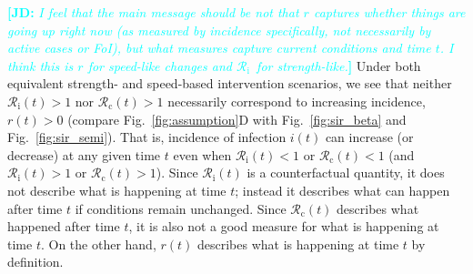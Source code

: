 \documentclass[12pt]{article}
\newcommand{\comment}{\showcomment}
\newcommand{\showcomment}[3]{\textcolor{#1}{\textbf{[#2: }\textsl{#3}\textbf{]}}}
\newcommand{\jd}[1]{\comment{cyan}{JD}{#1}}
\newcommand{\fref}[1]{Fig.~\ref{fig:#1}}
\newcommand{\Rx}[1]{\ensuremath{{\mathcal R}_{#1}}\xspace}
\newcommand{\Rc}{\Rx{\mathrm{c}}}
\newcommand{\Ri}{\Rx{\mathrm{i}}}
\begin{document}
\jd{I feel that the main message should be not that $r$ captures whether things are going up right now (as measured by incidence specifically, not necessarily by active cases or FoI), but what measures capture current \emph{conditions} and time $t$. I think this is $r$ for speed-like changes and \Ri\ for strength-like.}
Under both equivalent strength- and speed-based intervention scenarios, we see that neither $\Ri(t) > 1$ nor $\Rc(t) > 1$ necessarily correspond to increasing incidence, $r(t) > 0$ (compare \fref{assumption}D with \fref{sir_beta} and \fref{sir_semi}).
That is, incidence of infection $i(t)$ can increase (or decrease) at any given time $t$ even when $\Ri(t) < 1$ or $\Rc(t) < 1$ (and $\Ri(t) > 1$ or $\Rc(t) > 1$).
Since $\Ri(t)$ is a counterfactual quantity, it does not describe what is happening at time $t$; instead it describes what can happen after time $t$ if conditions remain unchanged.
Since $\Rc(t)$ describes what happened after time $t$, it is also not a good measure for what is happening at time $t$.
On the other hand, $r(t)$ describes what is happening at time $t$ by definition.
\end{document}
